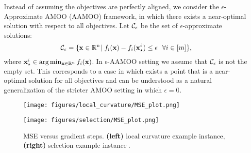 Instead of assuming the objectives are perfectly aligned, we consider the $\epsilon$-Approximate AMOO (AAMOO) framework, in which there exists a near-optimal solution with respect to all objectives. Let $\mathcal{C}_\epsilon$ be the set of $\epsilon$-approximate solutions:
\begin{align}
    \mathcal{C}_\epsilon = \{ {\mathbf{x}} \in \mathbb{R}^n | \ f_i({\mathbf{x}}) - f_i({\mathbf{x}}_{\star}^i) \leq \epsilon ~~ \forall i\in[m] \}, \label{eq:Ce_set}
\end{align}
where ${\mathbf{x}}_\star^i \in \arg\min_{{\mathbf{x}} \in \mathbb{R}^n}  f_i({\mathbf{x}})$. In $\epsilon$-AAMOO setting we assume that $\mathcal{C}_\epsilon$ is not the empty set. This corresponds to a case in which exists a point that is a near-optimal solution for all objectives and can be understood as a natural generalization of the stricter AMOO setting in which $\epsilon=0$. 

\begin{figure*}[t]
\vspace{-8pt}
    \centering
    \begin{minipage}{0.5\textwidth}
        \centering
        \texttt{[image: figures/local\_curvature/MSE\_plot.png]} %
    \end{minipage}\hfill
    \begin{minipage}{0.5\textwidth}
        \centering
        \texttt{[image: figures/selection/MSE\_plot.png]} %
    \end{minipage}
    \caption{MSE versus gradient steps. \textbf{(left)} local curvature example instance, \textbf{(right)} selection example instance .}
    \label{fig:experiments_main}
\end{figure*}


